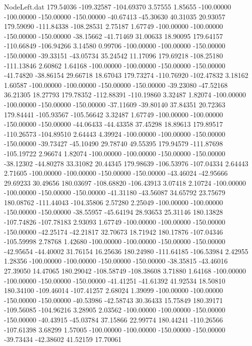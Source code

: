 \begin{filecontents}{NodeLeft.dat}
 179.54036 -109.32587 -104.69370     3.57555    1.85655 -100.00000 -100.00000 -150.00000 -150.00000  -40.67413  -45.30630   40.31035   20.93057
 179.59090 -111.84338 -108.28531     2.75187    1.67749 -100.00000 -100.00000 -150.00000 -150.00000  -38.15662  -41.71469   31.00633   18.90095
 179.64157 -110.66849 -106.94266     3.14580    0.99706 -100.00000 -100.00000 -150.00000 -150.00000  -39.33151  -43.05734   35.24542   11.17096
 179.69218 -108.25180 -111.13846     2.60862    1.64168 -100.00000 -100.00000 -150.00000 -150.00000  -41.74820  -38.86154   29.66718   18.67043
 179.73274 -110.76920 -102.47832     3.18162    1.60587 -100.00000 -100.00000 -150.00000 -150.00000  -39.23080  -47.52168   36.21305   18.27793
 179.78352 -112.88391 -110.19860     3.32487    1.82074 -100.00000 -100.00000 -150.00000 -150.00000  -37.11609  -39.80140   37.84351   20.72363
 179.84441 -105.93567 -105.56642     3.32487    1.67749 -100.00000 -100.00000 -150.00000 -150.00000  -44.06433  -44.43358   37.45298   18.89613
 179.89517 -110.26573 -104.89510     2.64443    4.39924 -100.00000 -100.00000 -150.00000 -150.00000  -39.73427  -45.10490   29.78740   49.55395
 179.94579 -111.87698 -105.19722     2.96674    1.82074 -100.00000 -100.00000 -150.00000 -150.00000  -38.12302  -44.80278   33.31082   20.44345
 179.98639 -106.53976 -107.04334     2.64443    2.71605 -100.00000 -100.00000 -150.00000 -150.00000  -43.46024  -42.95666   29.69233   30.49656
 180.03697 -108.68820 -106.43913     3.07418    2.10724 -100.00000 -100.00000 -150.00000 -150.00000  -41.31180  -43.56087   34.65792   23.75679
 180.08762 -111.44043 -104.35806     2.57280    2.25049 -100.00000 -100.00000 -150.00000 -150.00000  -38.55957  -45.64194   28.93653   25.31146
 180.13828 -107.74826 -107.78183     2.93093    1.67749 -100.00000 -100.00000 -150.00000 -150.00000  -42.25174  -42.21817   32.70673   18.71942
 180.17876 -107.04346 -105.59998     2.78768    1.42680 -100.00000 -100.00000 -150.00000 -150.00000  -42.95654  -44.40002   31.76154   16.25636
 180.24980 -111.64185 -106.53984     2.42955    1.28356 -100.00000 -100.00000 -150.00000 -150.00000  -38.35815  -43.46016   27.39050   14.47065
 180.29042 -108.58749 -108.38608     3.71880    1.64168 -100.00000 -100.00000 -150.00000 -150.00000  -41.41251  -41.61392   41.92534   18.50810
 180.34100 -109.46014 -107.41257     2.68024    1.39099 -100.00000 -100.00000 -150.00000 -150.00000  -40.53986  -42.58743   30.36433   15.75849
 180.39171 -109.56085 -104.96216     3.28905    2.03562 -100.00000 -100.00000 -150.00000 -150.00000  -40.43915  -45.03784   37.15866   22.99774
 180.44241 -110.26566 -107.61398     3.68299    1.57005 -100.00000 -100.00000 -150.00000 -150.00000  -39.73434  -42.38602   41.52159   17.70061

\end{filecontents}
